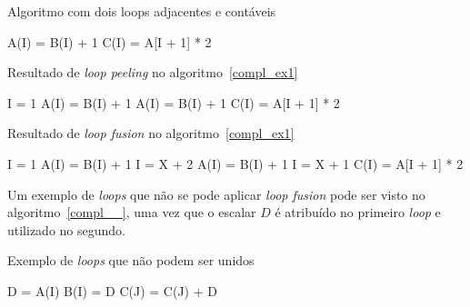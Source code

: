 \begin{algorithm}
\caption{Algoritmo com dois loops adjacentes e contáveis}
\label{compl_ex1}
\begin{algorithmic}[1]

\STATE A(I) = B(I) + 1
\ENDFOR
{}
\STATE C(I) = A[I + 1] * 2
\ENDFOR

\end{algorithmic}
\end{algorithm}

\begin{algorithm}
\caption{Resultado de \textit{loop peeling} no algoritmo~\ref{compl_ex1}}
\label{compl_ex2}
\begin{algorithmic}[1]

\STATE I = 1
\STATE A(I) = B(I) + 1
\STATE A(I) = B(I) + 1
\ENDFOR
{}
\STATE C(I) = A[I + 1] * 2
\ENDFOR

\end{algorithmic}
\end{algorithm}

\begin{algorithm}
\caption{Resultado de \textit{loop fusion} no algoritmo~\ref{compl_ex1}}
\label{compl_ex3}
\begin{algorithmic}[1]

\STATE I = 1
\STATE A(I) = B(I) + 1
\STATE I = X + 2
\STATE A(I) = B(I) + 1
\STATE I = X + 1
\STATE C(I) = A[I + 1] * 2
\ENDFOR

\end{algorithmic}
\end{algorithm}

Um exemplo de \textit{loops} que não se pode aplicar \textit{loop fusion} pode
ser visto no algoritmo~\ref{compl__}, uma vez que o escalar $D$ é atribuído no
primeiro \textit{loop} e utilizado no segundo.

\begin{algorithm}
\caption{Exemplo de \textit{loops} que não podem ser unidos}
\label{compl__}
\begin{algorithmic}[1]

\STATE D = A(I)
\STATE B(I) = D
\ENDFOR
{} 
\STATE C(J) = C(J) + D
\ENDFOR

\end{algorithmic}
\end{algorithm}
